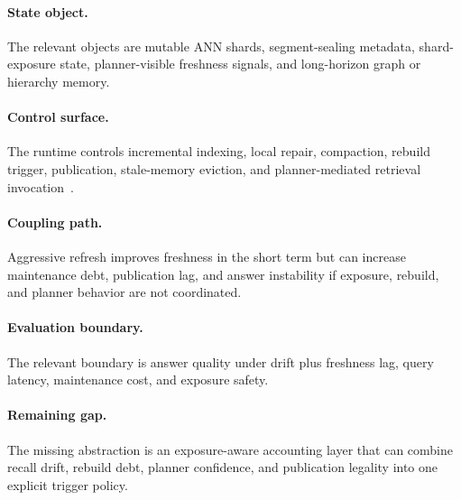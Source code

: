 \paragraph{State object.}
The relevant objects are mutable ANN shards, segment-sealing metadata, shard-exposure state, planner-visible freshness signals, and long-horizon graph or hierarchy memory.

\paragraph{Control surface.}
The runtime controls incremental indexing, local repair, compaction, rebuild trigger, publication, stale-memory eviction, and planner-mediated retrieval invocation~\cite{singh2021freshdiskann,wang2021milvus,guo2022manu,asai2024selfrag,zhang2026flowrag,wang2026candor}.

\paragraph{Coupling path.}
Aggressive refresh improves freshness in the short term but can increase maintenance debt, publication lag, and answer instability if exposure, rebuild, and planner behavior are not coordinated.

\paragraph{Evaluation boundary.}
The relevant boundary is answer quality under drift plus freshness lag, query latency, maintenance cost, and exposure safety.

\paragraph{Remaining gap.}
The missing abstraction is an exposure-aware accounting layer that can combine recall drift, rebuild debt, planner confidence, and publication legality into one explicit trigger policy.
